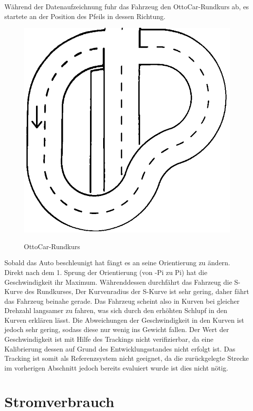 Während der Datenaufzeichnung fuhr das Fahrzeug den OttoCar-Rundkurs ab, es startete  an der Position des Pfeils in dessen Richtung.


\begin{figure}[H]
\centering
\includegraphics[width=.8\textwidth]{Strasse_mono.png}\\
\caption{OttoCar-Rundkurs}%
\label{fig:strasse}
\end{figure}

Sobald das Auto beschleunigt hat fängt es an seine Orientierung zu ändern. Direkt nach dem 1. Sprung der Orientierung (von -Pi zu Pi)
hat die Geschwindigkeit ihr Maximum. Währenddessen durchfährt das Fahrzeug die S-Kurve des Rundkurses, Der Kurvenradius der S-Kurve ist sehr gering, daher fährt das Fahrzeug
beinahe gerade. Das Fahrzeug scheint also in Kurven bei gleicher Drehzahl langsamer zu fahren, was sich durch  den erhöhten Schlupf in den Kurven erklären lässt. Die Abweichungen 
der Geschwindigkeit in den Kurven ist jedoch sehr gering, sodass diese nur wenig ins Gewicht fallen. Der Wert der Geschwindigkeit ist mit Hilfe des Trackings nicht verifizierbar,
da eine Kalibrierung dessen auf Grund des Entwicklungsstandes nicht erfolgt ist. Das Tracking ist somit als Referenzsystem nicht geeignet, da die zurückgelegte Strecke im vorherigen
Abschnitt jedoch bereits evaluiert wurde ist dies nicht nötig.


\section{Stromverbrauch}

